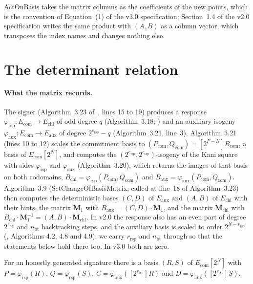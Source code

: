 \documentclass[version=submission]{iacrcc}
\newcommand{\ers}{e_{\mathrm{rsp}}}
\newcommand{\nbt}{n_{\mathrm{bt}}}
\newcommand{\rrs}{r_{\mathrm{rsp}}}
\newcommand{\Mm}{\mathbf{M}}
\newcommand{\Echl}{E_{\mathrm{chl}}}
\newcommand{\Eaux}{E_{\mathrm{aux}}}
\newcommand{\Ecom}{E_{\mathrm{com}}}
\begin{document}
ActOnBasis takes the matrix columns as the coefficients of the new points, which is the convention of Equation~(1) of the v3.0 specification; Section~1.4
of the v2.0 specification writes the same product with $(A, B)$ as a column
vector, which transposes the index names and changes nothing else.

\section{The determinant relation}
\label{sec:formula}

\paragraph{What the matrix records.}
The signer (Algorithm~3.23 of~\cite{sqisign-spec-r3}, lines 15 to 19)
produces a response $\varphi_{\mathrm{rsp}} : \Ecom \to \Echl$ of odd
degree $q$ (Algorithm~3.18; \cite[Section~9.5]{sqisign-spec-r3}) and an auxiliary isogeny
$\varphi_{\mathrm{aux}} : \Ecom \to \Eaux$ of degree $2^{\ers} - q$
(Algorithm~3.21, line~3). Algorithm~3.21 (lines 10 to 12) scales the
commitment basis to $(P_{\mathrm{com}}, Q_{\mathrm{com}}) = [2^{F - N}]
B_{\mathrm{com}}$, a basis of $\Ecom[2^N]$, and computes the
$(2^{\ers}, 2^{\ers})$-isogeny of the Kani square with sides
$\varphi_{\mathrm{rsp}}$ and $\varphi_{\mathrm{aux}}$
(Algorithm~3.20), which returns the images of that basis on both
codomains, $B_{\mathrm{chl}} = \varphi_{\mathrm{rsp}}(P_{\mathrm{com}},
Q_{\mathrm{com}})$ and $B_{\mathrm{aux}} =
\varphi_{\mathrm{aux}}(P_{\mathrm{com}}, Q_{\mathrm{com}})$.
Algorithm~3.9 (SetChangeOfBasisMatrix, called at line~18 of
Algorithm~3.23) then computes the deterministic bases $(C, D)$ of $\Eaux$
and $(A, B)$ of $\Echl$ with their hints, the matrix $\Mm_1$ with
$B_{\mathrm{aux}} = (C, D) \cdot \Mm_1$, and the matrix
$\Mm_{\mathrm{chl}}$ with $B_{\mathrm{chl}} \cdot \Mm_1^{-1} = (A, B)
\cdot \Mm_{\mathrm{chl}}$. In v2.0 the response also has an even part of
degree $2^{\rrs}$ and $\nbt$ backtracking steps, and the auxiliary basis
is scaled to order $2^{N - \rrs}$ (\cite{sqisign-spec-r2}, Algorithms 4.2,
4.8 and 4.9); we carry $\rrs$ and $\nbt$ through so that the statements
below hold there too. In v3.0 both are zero.

\begin{lemma}
\label{lem:records}
For an honestly generated signature there is a basis $(R, S)$ of
$\Ecom[2^N]$ with $P = \varphi_{\mathrm{rsp}}(R)$, $Q =
\varphi_{\mathrm{rsp}}(S)$, $C = \varphi_{\mathrm{aux}}([2^{\rrs}] R)$
and $D = \varphi_{\mathrm{aux}}([2^{\rrs}] S)$.
\end{lemma}
\end{document}
